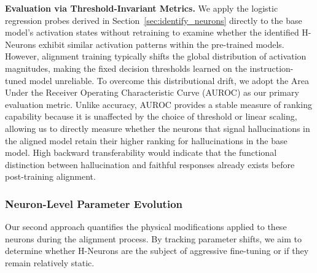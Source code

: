 \documentclass[dvipsnames]{article}
\begin{document}
\textbf{Evaluation via Threshold-Invariant Metrics.}\quad
We apply the logistic regression probes derived in Section~\ref{sec:identify_neurons} directly to the base model's activation states without retraining to examine whether the identified H-Neurons exhibit similar activation patterns within the pre-trained models.
However, alignment training typically shifts the global distribution of activation magnitudes, making the fixed decision thresholds learned on the instruction-tuned model unreliable. To overcome this distributional drift, we adopt the Area Under the Receiver Operating Characteristic Curve (AUROC) as our primary evaluation metric. Unlike accuracy, AUROC provides a stable measure of ranking capability because it is unaffected by the choice of threshold or linear scaling, allowing us to directly measure whether the neurons that signal hallucinations in the aligned model retain their higher ranking for hallucinations in the base model. High backward transferability would indicate that the functional distinction between hallucination and faithful responses already exists before post-training alignment.

\subsubsection{Neuron-Level Parameter Evolution}

Our second approach quantifies the physical modifications applied to these neurons during the alignment process. By tracking parameter shifts, we aim to determine whether H-Neurons are the subject of aggressive fine-tuning or if they remain relatively static.
\end{document}
